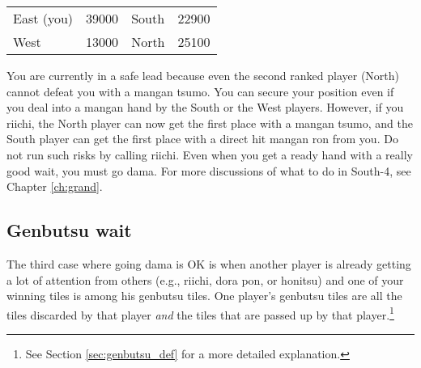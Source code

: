 \begin{center}
\begin{tabular}{l r l r}
East (you) & 39000 & South & 22900\\
West & 13000 & North & 25100\\
\end{tabular}
\end{center}

You are currently in a safe lead because even the second ranked player (North) cannot defeat you with a {\jap mangan tsumo}. You can secure your position even if you deal into a {\jap mangan} hand by the South or the West players. However, if you {\jap riichi}, the North player can now get the first place with a {\jap mangan tsumo}, and the South player can get the first place with a direct hit {\jap mangan ron} from you. Do not run such risks by calling {\jap riichi}. Even when you get a ready hand with a really good wait, you must go {\jap dama}. For more discussions of what to do in South-4, see Chapter \ref{ch:grand}.

\subsection{{\jap Genbutsu} wait}  \label{sec:genbutsu}
The third case where going {\jap dama} is OK is when another player is already getting a lot of attention from others (e.g., {\jap riichi}, {\jap dora} {\jap pon}, or {\jap honitsu}) and one of your winning tiles is among his {\jap genbutsu} tiles.
One player's {\jap genbutsu} tiles are all the tiles discarded by that player \emph{and} the tiles that are passed up by that player.\footnote{See Section \ref{sec:genbutsu_def} for a more detailed explanation.}

